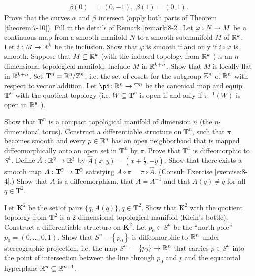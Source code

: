 \begin{enumerate}[\theexercise.1]
\[\begin{aligned}
      \beta ( 0)  & = ( {0,- 1}),\;\beta ( 1)  = ( {0,1}).
    \end{aligned}
    \]
    Prove that the curves $\alpha$ and $\beta$ intersect (apply both parts of Theorem \ref{theorem:7-10}).
  \newchap[8]
  \NewItem Fill in the details of Remark \ref{remark:8-2}.
  \NewItem Let $\varphi  : N \rightarrow  M$ be a continuous map from a smooth manifold $N$ to a smooth submanifold $M$ of ${\mathbb{R}}^{k}$. Let $i : M \rightarrow  {\ensuremath{\mathbb{R}}}^{k}$ be the inclusion. Show that $\varphi$ is smooth if and only if $i \circ  \varphi$ is smooth.
  \NewItem Suppose that $M \subseteq  {\ensuremath{\mathbb{R}}}^{k}$ (with the induced topology from ${\mathbb{R}}^{k}$ ) is an $n$- dimensional topological manifold. Include $M$ in ${\mathbb{R}}^{k + n}$. Show that $M$ is locally flat in ${\mathbb{R}}^{k + n}$.
  \NewItem Set ${\mathbf{T}}^{n} = {\mathbb{R}}^{n}/{\mathbb{Z}}^{n}$, i.e. the set of cosets for the subgroup ${\mathbb{Z}}^{n}$ of ${\mathbb{R}}^{n}$ with respect to vector addition. Let $\pi\colon  {\B{R}}^{n} \ra  {\B{T}}^{n}$ be the canonical map and equip ${\mathbf{T}}^{n}$ with the quotient topology (i.e. $W \subseteq  {\mathbf{T}}^{n}$ is open if and only if ${\pi }^{-1}( W)$ is open in ${\mathbb{R}}^{n}$ ).\par
    Show that ${\mathbf{T}}^{n}$ is a compact topological manifold of dimension $n$ (the $n$- dimensional torus). Construct a differentiable structure on ${\mathbf{T}}^{n}$, such that $\pi$ becomes smooth and every $p \in  {\ensuremath{\mathbb{R}}}^{n}$ has an open neighborhood that is mapped diffeomorphically onto an open set in ${\mathbf{T}}^{n}$ by $\pi$. Prove that ${\mathbf{T}}^{1}$ is diffeomorphic to ${S}^{1}$.
  \NewItem Define $\hat{A} : {\mathbb{R}}^{2} \rightarrow  {\ensuremath{\mathbb{R}}}^{2}$ by $\hat{A}( {x,y})  = ( {x + \frac{1}{2},- y})$. Show that there exists a smooth map $A : {\mathbf{T}}^{2} \rightarrow  {\mathbf{T}}^{2}$ satisfying $A \circ  \pi  = \pi  \circ  \hat{A}$. (Consult Exercise \ref{exercise:8-4}.) Show that $A$ is a diffeomorphism, that $A = {A}^{-1}$ and that $A( q)  \neq  q$ for all $q \in  {\mathrm{T}}^{2}$.\par
    Let ${\mathbf{K}}^{2}$ be the set of pairs $\{ q,A( q) \},q \in  {\mathbf{T}}^{2}$. Show that ${\mathbf{K}}^{2}$ with the quotient topology from ${\mathbf{T}}^{2}$ is a 2-dimensional topological manifold (Klein's bottle).
    Construct a differentiable structure on ${\mathbf{K}}^{2}$.
  \NewItem Let ${p}_{0} \in  {S}^{n}$ be the ``north pole'' ${p}_{0} = ( {0,\ldots,0,1})$. Show that ${S}^{n}- \left\{  {p}_{0}\right\}$ is diffeomorphic to ${\mathbb{R}}^{n}$ under stereographic projection, i.e. the map ${S}^{n}-$  $\left\{  {p}_{0}\right\}   \rightarrow  {\ensuremath{\mathbb{R}}}^{n}$ that carries $p \in  {S}^{n}$ into the point of intersection between the line through ${p}_{0}$ and $p$ and the equatorial hyperplane ${\mathbb{R}}^{n} \subseteq  {\ensuremath{\mathbb{R}}}^{n + 1}$.

\end{enumerate}
